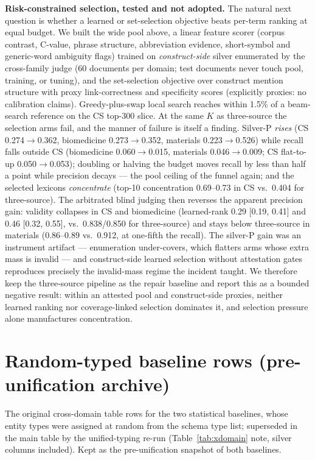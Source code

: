 \documentclass[preprint,12pt]{elsarticle}
\begin{document}
\textbf{Risk-constrained selection, tested and not adopted.} The
natural next question is whether a learned or set-selection objective
beats per-term ranking at equal budget. We built the wide pool above,
a linear feature scorer (corpus contrast, C-value, phrase structure,
abbreviation evidence, short-symbol and generic-word ambiguity flags)
trained on \emph{construct-side} silver enumerated by the cross-family
judge (60 documents per domain; test documents never touch pool,
training, or tuning), and the set-selection objective over construct
mention structure with proxy link-correctness and specificity scores
(explicitly proxies: no calibration claims). Greedy-plus-swap local
search reaches within 1.5\% of a beam-search reference on the CS
top-300 slice. At the same $K$ as three-source the selection arms
fail, and the manner of failure is itself a finding. Silver-P
\emph{rises} (CS 0.274$\to$0.362, biomedicine 0.273$\to$0.352,
materials 0.223$\to$0.526) while recall falls outside CS
(biomedicine 0.060$\to$0.015, materials 0.046$\to$0.009; CS
flat-to-up 0.050$\to$0.053); doubling or halving the budget moves
recall by less than half a point while precision decays --- the pool
ceiling of the funnel again; and the selected lexicons
\emph{concentrate} (top-10 concentration 0.69--0.73 in CS vs.\
0.404 for three-source). The arbitrated blind judging then reverses
the apparent precision gain: validity collapses in CS and biomedicine
(learned-rank 0.29 [0.19, 0.41] and 0.46 [0.32, 0.55], vs.\
0.838/0.850 for three-source) and stays below three-source in
materials (0.86--0.89 vs.\ 0.912, at one-fifth the recall). The
silver-P gain was an instrument artifact --- enumeration
under-covers, which flatters arms whose extra mass is invalid --- and
construct-side learned selection without attestation gates reproduces
precisely the invalid-mass regime the incident taught. We therefore
keep the three-source pipeline as the repair baseline and report this
as a bounded negative result: within an attested pool and
construct-side proxies, neither learned ranking nor coverage-linked
selection dominates it, and selection pressure alone manufactures
concentration.

\section{Random-typed baseline rows (pre-unification archive)}
\label{app:randtyped}

The original cross-domain table rows for the two statistical
baselines, whose entity types were assigned at random from the schema
type list; superseded in the main table by the unified-typing re-run
(Table~\ref{tab:xdomain} note, silver columns included). Kept as the
pre-unification snapshot of both baselines.
\end{document}
